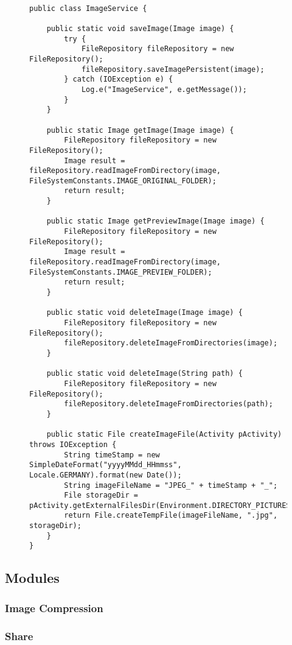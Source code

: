 \begin{figure}[H]
\begin{lstlisting}[caption=ImageService (Ruthild Gilles)]

public class ImageService {

    public static void saveImage(Image image) {
        try {
            FileRepository fileRepository = new FileRepository();
            fileRepository.saveImagePersistent(image);
        } catch (IOException e) {
            Log.e("ImageService", e.getMessage());
        }
    }

    public static Image getImage(Image image) {
        FileRepository fileRepository = new FileRepository();
        Image result = fileRepository.readImageFromDirectory(image, FileSystemConstants.IMAGE_ORIGINAL_FOLDER);
        return result;
    }

    public static Image getPreviewImage(Image image) {
        FileRepository fileRepository = new FileRepository();
        Image result = fileRepository.readImageFromDirectory(image, FileSystemConstants.IMAGE_PREVIEW_FOLDER);
        return result;
    }

    public static void deleteImage(Image image) {
        FileRepository fileRepository = new FileRepository();
        fileRepository.deleteImageFromDirectories(image);
    }

    public static void deleteImage(String path) {
        FileRepository fileRepository = new FileRepository();
        fileRepository.deleteImageFromDirectories(path);
    }

    public static File createImageFile(Activity pActivity) throws IOException {
        String timeStamp = new SimpleDateFormat("yyyyMMdd_HHmmss", Locale.GERMANY).format(new Date());
        String imageFileName = "JPEG_" + timeStamp + "_";
        File storageDir = pActivity.getExternalFilesDir(Environment.DIRECTORY_PICTURES);
        return File.createTempFile(imageFileName, ".jpg", storageDir);
    }
}
\end{lstlisting}
\end{figure}

\subsection{Modules}
	\subsubsection{Image Compression}
	\subsubsection{Share}
